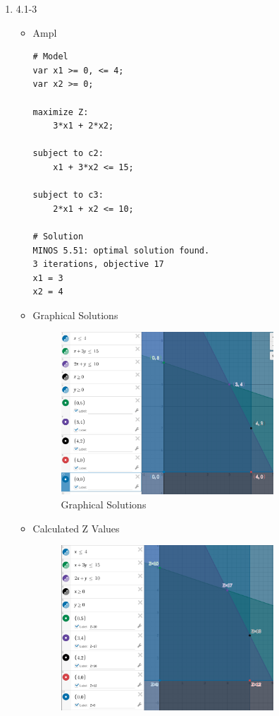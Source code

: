 \documentclass[12pt, letter]{article}
\begin{document}
\begin{enumerate}
\item 4.1-3
\begin{itemize}
\item Ampl
\begin{verbatim}
# Model
var x1 >= 0, <= 4;
var x2 >= 0;

maximize Z:
	3*x1 + 2*x2;

subject to c2:
	x1 + 3*x2 <= 15;

subject to c3:
	2*x1 + x2 <= 10;

# Solution
MINOS 5.51: optimal solution found.
3 iterations, objective 17
x1 = 3
x2 = 4
\end{verbatim}
\item Graphical Solutions
\begin{figure}[h]
	\centering
	\includegraphics[width=0.8\textwidth]{p4a}
	\caption{Graphical Solutions}
	\label{fig:p4a}
\end{figure}
\item Calculated Z Values
\begin{figure}[h]
	\centering
	\includegraphics[width=0.8\textwidth]{p4b}

\end{figure}
\end{itemize}
\end{enumerate}
\end{document}
